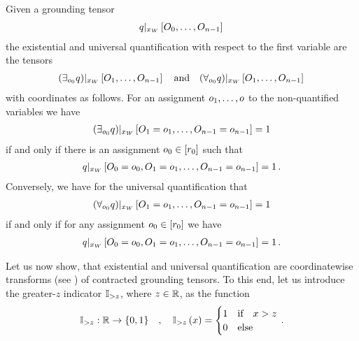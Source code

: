 \begin{definition}
    Given a grounding tensor
    \begin{align*}
        {q}|_{x_{W}} \left[O_{0},\ldots,O_{n-1}\right] \,
    \end{align*}
    the existential and universal quantification with respect to the first variable are the tensors
    \begin{align*}
        {\left(\exists_{o_{0}}q\right)}|_{x_{W}} \left[O_{1},\ldots,O_{n-1}\right] \quad \text{and} \quad
        {\left(\forall_{o_{0}}q\right)}|_{x_{W}} \left[O_{1},\ldots,O_{n-1}\right] \,
    \end{align*}
    with coordinates as follows.
    For an assignment $o_{1},\ldots,o$ to the non-quantified variables we have
    \begin{align*}
        {\left(\exists_{o_{0}}q\right)}|_{x_{W}} \left[O_{1}=o_{1},\ldots,O_{n-1}=o_{n-1}\right] = 1
    \end{align*}
    if and only if there is an assignment $o_{0}\in[r_{0}]$ such that
    \begin{align*}
        {q}|_{x_{W}} \left[O_{0}=o_{0},O_{1}=o_{1},\ldots,O_{n-1}=o_{n-1}\right] = 1 \, .
    \end{align*}
    Conversely, we have for the universal quantification that
    \begin{align*}
        {\left(\forall_{o_{0}}q\right)}|_{x_{W}} \left[O_{1}=o_{1},\ldots,O_{n-1}=o_{n-1}\right] = 1
    \end{align*}
    if and only if for any assignment $o_{0}\in[r_{0}]$ we have
    \begin{align*}
        {q}|_{x_{W}} \left[O_{0}=o_{0},O_{1}=o_{1},\ldots,O_{n-1}=o_{n-1}\right] = 1 \, .
    \end{align*}
\end{definition}


Let us now show, that existential and universal quantification are coordinatewise transforms (see ) of contracted grounding tensors.
To this end, let us introduce the greater-$z$ indicator $\mathbb{I}_{>z}$, where $z\in\mathbb{R}$, as the function
\begin{align*}
    \mathbb{I}_{>z} : \mathbb{R} \rightarrow \{0,1\}
    \quad, \quad \mathbb{I}_{>z}\left(x\right) =
    \begin{cases}
        1 & \text{if}\quad x > z\\
        0 & \text{else}
    \end{cases} \, .
\end{align*}

